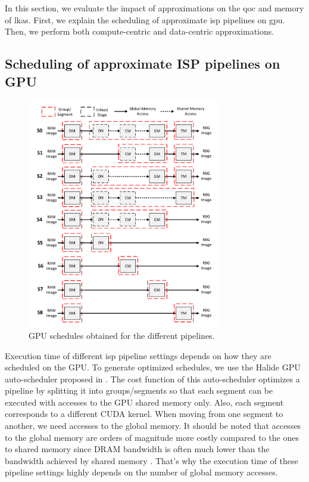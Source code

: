 In this section, we evaluate the impact of approximations on the \gls{qoc} and memory of \gls{lkas}. 
First, we explain the scheduling of approximate \gls{isp} pipelines on \gls{gpu}.
Then, we perform both compute-centric and data-centric approximations. 

\subsection{Scheduling of approximate ISP pipelines on GPU}
\begin{figure}[ht]
    \centering
    \includegraphics[width= 0.75\textwidth]{figs/isp_schedules.pdf}
    \caption{{GPU schedules obtained for the different pipelines.}}
    \label{fig:gpu_sched}
\end{figure}
Execution time of different \gls{isp} pipeline settings depends on how they are scheduled on the GPU.  To generate optimized schedules, we use the Halide GPU auto-scheduler proposed in \cite{halide-auto}. The cost function of this auto-scheduler optimizes a pipeline by splitting it into groups/segments so that each segment can be executed with accesses to the GPU shared memory only. Also, each segment corresponds to a different CUDA kernel. When moving from one segment to another, we need accesses to the global memory. It should be noted that accesses to the global memory are orders of magnitude more costly compared to the ones to shared memory since DRAM bandwidth is often much lower than the bandwidth achieved by shared memory \cite{halide-auto}. That’s why the execution time of these pipeline settings highly depends on the number of global memory accesses.

